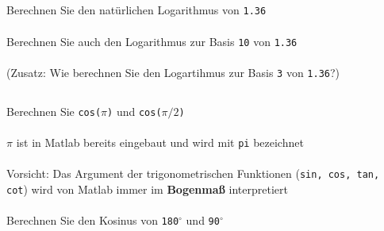   \subsection{\mexercise}
  \begin{frame}
    \frametitle{\mexercise}
    \begin{exercise}
        Berechnen Sie den natürlichen Logarithmus von \texttt{1.36} \\ \\
        Berechnen Sie auch den Logarithmus zur Basis \texttt{10} von \texttt{1.36} \\ \\
        (Zusatz: Wie berechnen Sie den Logartihmus zur Basis \texttt{3} von \texttt{1.36}?)
    \end{exercise}
\end{frame}

\subsection{\mexercise}
\begin{frame}
  \frametitle{\mexercise}
  \begin{exercise}
      Berechnen Sie \texttt{cos($\pi$)} und \texttt{cos($\pi / 2$)} \\ \\
      $\pi$ ist in Matlab bereits eingebaut und wird mit \texttt{pi} bezeichnet \\ \\
      \alert{Vorsicht}: Das Argument der trigonometrischen Funktionen (\texttt{sin, cos, tan, cot}) wird von Matlab immer im \textbf{Bogenmaß} interpretiert \\ \\
      Berechnen Sie den Kosinus von \texttt{180$^{\circ}$} und \texttt{90$^{\circ}$}
  \end{exercise}
\end{frame}

